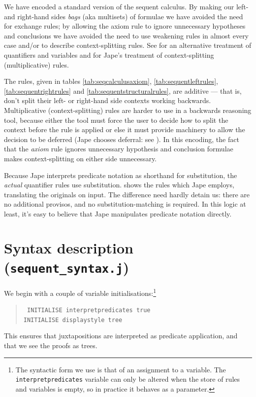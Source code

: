 We have encoded a standard version of the sequent calculus. By making our left- and right-hand sides \textit{bags} (aka multisets) of formulae we have avoided the need for exchange rules; by allowing the axiom rule to ignore unnecessary hypotheses and conclusions we have avoided the need to use weakening rules in almost every case and/or to describe context-splitting rules. See  for an alternative treatment of quantifiers and variables and for Jape's treatment of context-splitting (multiplicative) rules.

The rules, given in tables \ref{tab:seqcalculusaxiom}, \ref{tab:sequentleftrules}, \ref{tab:sequentrightrules} and \ref{tab:sequentstructuralrules}, are additive --- that is, don't split their left- or right-hand side contexts working backwards. Multiplicative (context-splitting) rules are harder to use in a backwards reasoning tool, because either the tool must force the user to decide how to split the context before the rule is applied or else it must provide machinery to allow the decision to be deferred (Jape chooses deferral: see ). In this encoding, the fact that the \textit{axiom} rule ignores unnecessary hypothesis and conclusion formulae makes context-splitting on either side unnecessary.

Because Jape interprets predicate notation as shorthand for substitution, the \textit{actual} quantifier rules use substitution.  shows the rules which Jape employs, translating the originals on input. The difference need hardly detain us: there are no additional provisos, and no substitution-matching is required. In this logic at least, it's easy to believe that Jape manipulates predicate notation directly.


\section{Syntax description (\texttt{sequent\_syntax.j})}

We begin with a couple of variable initialisations:\footnote{The syntactic form we use is that of an assignment to a variable. The \texttt{interpretpredicates} variable can only be altered when the store of rules and variables is empty, so in practice it behaves as a parameter.}
\begin{quote}\tt\small
INITIALISE interpretpredicates true \\
INITIALISE displaystyle tree
\end{quote}
This ensures that juxtapositions are interpreted as predicate application, and that we see the proofs as trees.

